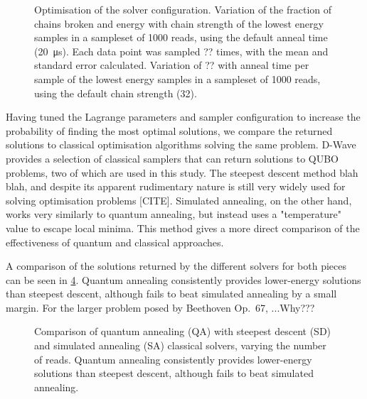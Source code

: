 \documentclass[12pt]{article}
\theoremstyle{definition}
\begin{document}
\begin{figure}
    \centering\small
    \begin{subfigure}{\textwidth}
        \centering
        
        \caption{}
        \label{fig:chain-strength}
    \end{subfigure}
    \begin{subfigure}{\textwidth}
        \centering
        
        \caption{}
        \label{fig:anneal-time}
    \end{subfigure}
    
    \caption{Optimisation of the solver configuration.  Variation of the fraction of chains broken and energy with chain strength of the lowest energy samples in a sampleset of 1000 reads, using the default anneal time (\qty{20}{\us}). Each data point was sampled ?? times, with the mean and standard error calculated.  Variation of ?? with anneal time per sample of the lowest energy samples in a sampleset of 1000 reads, using the default chain strength (\num{32}).}
    \label{fig:solver-configuration}
\end{figure}

Having tuned the Lagrange parameters and sampler configuration to increase the probability of finding the most optimal solutions, we compare the returned solutions to classical optimisation algorithms solving the same problem. D-Wave provides a selection of classical samplers that can return solutions to QUBO problems, two of which are used in this study. The steepest descent method blah blah, and despite its apparent rudimentary nature is still very widely used for solving optimisation problems [CITE]. Simulated annealing, on the other hand, works very similarly to quantum annealing, but instead uses a "temperature" value to escape local minima. This method gives a more direct comparison of the effectiveness of quantum and classical approaches.

A comparison of the solutions returned by the different solvers for both pieces can be seen in \cref{fig:reads}. Quantum annealing consistently provides lower-energy solutions than steepest descent, although fails to beat simulated annealing by a small margin. For the larger problem posed by Beethoven Op.\ 67, ...Why???

\begin{figure}
    \centering\small
    
    \caption{Comparison of quantum annealing (QA) with steepest descent (SD) and simulated annealing (SA) classical solvers, varying the number of reads. Quantum annealing consistently provides lower-energy solutions than steepest descent, although fails to beat simulated annealing.}
    \label{fig:reads}
\end{figure}
\end{document}
